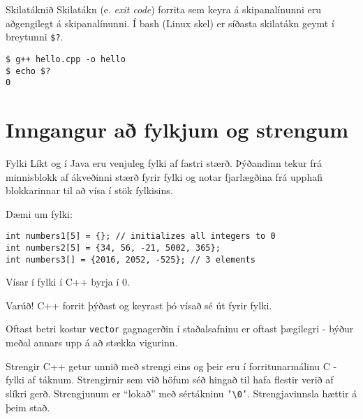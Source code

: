 \documentclass[handout]{beamer}
\begin{document}
\begin{frame}[fragile]{Skilatáknið}
Skilatákn (e. \emph{exit code}) forrita sem keyra á skipanalínunni eru aðgengilegt á skipanalínunni. Í bash (Linux skel) er síðasta skilatákn geymt í breytunni \texttt{\$?}.

\begin{verbatim}
$ g++ hello.cpp -o hello
$ echo $?
0
\end{verbatim}
\end{frame}

\section{Inngangur að fylkjum og strengum}

\begin{frame}[fragile]{Fylki}
Líkt og í Java eru venjuleg fylki af fastri stærð. Þýðandinn tekur frá minnisblokk af ákveðinni stærð fyrir fylki og notar fjarlægðina frá upphafi blokkarinnar til að vísa í stök fylkisins.

Dæmi um fylki:
\begin{verbatim}
int numbers1[5] = {}; // initializes all integers to 0
int numbers2[5] = {34, 56, -21, 5002, 365};
int numbers3[] = {2016, 2052, -525}; // 3 elements
\end{verbatim}
Vísar í fylki í C++ byrja í 0.

\end{frame}

\begin{frame}{Varúð!}
C++ forrit þýðast og keyrast þó vísað sé út fyrir fylki.
\end{frame}

\begin{frame}[fragile]{Oftast betri kostur}
\texttt{vector} gagnagerðin í staðalsafninu er oftast þægilegri - býður meðal annars upp á að stækka vigurinn.
\end{frame}

\begin{frame}{Strengir}
C++ getur unnið með strengi eins og þeir eru í forritunarmálinu C - fylki af táknum. Strengirnir sem við höfum séð hingað til hafa flestir verið af slíkri gerð.
Strengjunum er ``lokað'' með sértákninu \texttt{'\textbackslash0'}. Strengjavinnsla hættir á þeim stað.
\end{frame}
\end{document}
